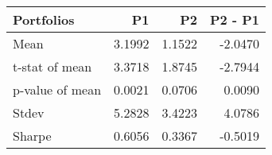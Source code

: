 \begin{tabular}{lrrr}
\toprule
Portfolios & P1 & P2 & P2 - P1 \\
\midrule
Mean & 3.1992 & 1.1522 & -2.0470 \\
t-stat of mean & 3.3718 & 1.8745 & -2.7944 \\
p-value of mean & 0.0021 & 0.0706 & 0.0090 \\
Stdev & 5.2828 & 3.4223 & 4.0786 \\
Sharpe & 0.6056 & 0.3367 & -0.5019 \\
\bottomrule
\end{tabular}
